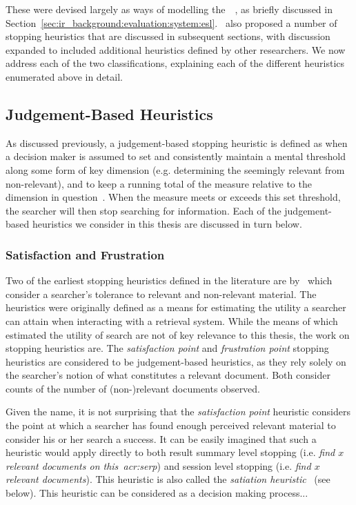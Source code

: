 These were devised largely as ways of modelling the~~\citep{cooper1968expected_search_length}, as briefly discussed in Section~\ref{sec:ir_background:evaluation:system:esl}.~\cite{nickles1995judgment} also proposed a number of stopping heuristics that are discussed in subsequent sections, with discussion expanded to included additional heuristics defined by other researchers. We now address each of the two classifications, explaining each of the different heuristics enumerated above in detail.

\subsection{Judgement-Based Heuristics}\label{sec:stopping_background:heuristics:judgement}
As discussed previously, a judgement-based stopping heuristic is defined as when a decision maker is assumed to set and consistently maintain a mental threshold along some form of key dimension (e.g. determining the seemingly relevant from non-relevant), and to keep a running total of the measure relative to the dimension in question~\citep{gettys1979hypothesis, nickles1995judgment}. When the measure meets or exceeds this set threshold, the searcher will then stop searching for information. Each of the judgement-based heuristics we consider in this thesis are discussed in turn below.

\subsubsection{Satisfaction and Frustration}\label{sec:stopping_background:heuristics:frustration}
Two of the earliest stopping heuristics defined in the literature are by~\cite{cooper1973retrieval_effectiveness_ii} which consider a searcher's tolerance to relevant and non-relevant material. The heuristics were originally defined as a means for estimating the utility a searcher can attain when interacting with a retrieval system. While the means of which~\cite{cooper1973retrieval_effectiveness_ii} estimated the utility of search are not of key relevance to this thesis, the work on stopping heuristics are. The \emph{satisfaction point} and \emph{frustration point} stopping heuristics are considered to be judgement-based heuristics, as they rely solely on the searcher's notion of what constitutes a relevant document. Both consider counts of the number of (non-)relevant documents observed.

Given the name, it is not surprising that the \emph{satisfaction point} heuristic considers the point at which a searcher has found enough perceived relevant material to consider his or her search a success. It can be easily imagined that such a heuristic would apply directly to both result summary level stopping (i.e. \emph{find $x$ relevant documents on this~\gls{acr:serp}}) and session level stopping (i.e. \emph{find $x$ relevant documents}). This heuristic is also called the \emph{satiation heuristic}~\citep{simon1955satiation} (see below). This heuristic can be considered as a decision making process...

